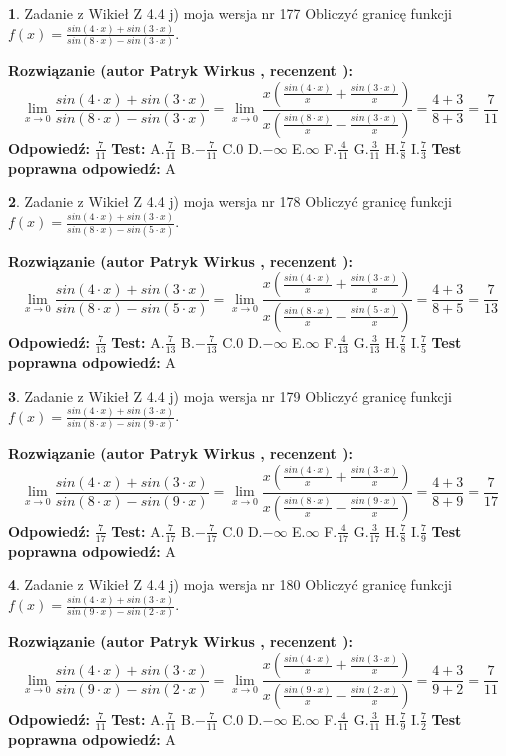 \documentclass[12pt, a4paper]{article}
\theoremstyle{definition} %
\newtheorem{zad}{}
\newcommand{\zadStart}[1]{\begin{zad}#1\newline}
\newcommand{\zadStop}{\end{zad}}
\newcommand{\rozwStart}[2]{\noindent \textbf{Rozwiązanie (autor #1 , recenzent #2): }\newline}
\newcommand{\rozwStop}{\newline}
\newcommand{\odpStart}{\noindent \textbf{Odpowiedź:}\newline}
\newcommand{\odpStop}{\newline}
\newcommand{\testStart}{\noindent \textbf{Test:}\newline}
\newcommand{\testStop}{\newline}
\newcommand{\kluczStart}{\noindent \textbf{Test poprawna odpowiedź:}\newline}
\newcommand{\kluczStop}{\newline}
\begin{document}
\zadStart{Zadanie z Wikieł Z 4.4 j) moja wersja nr 177}
Obliczyć granicę funkcji $f(x)=\frac{sin(4\cdot x) +sin(3\cdot x)}{sin(8\cdot x) -sin(3\cdot x)}$.
\zadStop
\rozwStart{Patryk Wirkus}{}
$$\lim\limits_{x\to 0}\frac{sin(4\cdot x) +sin(3\cdot x)}{sin(8\cdot x) -sin(3\cdot x)}=\lim\limits_{x\to 0}\frac{x(\frac{sin(4\cdot x)}{x}+\frac{sin(3\cdot x)}{x})}{x(\frac{sin(8\cdot x)}{x}-\frac{sin(3\cdot x)}{x})}=\frac{4+3}{8+3} = \frac{7}{11}$$
\rozwStop
\odpStart
$\frac{7}{11}$
\odpStop
\testStart
A.$\frac{7}{11}$
B.$-\frac{7}{11}$
C.$0$
D.$-\infty$
E.$\infty$
F.$\frac{4}{11}$
G.$\frac{3}{11}$
H.$\frac{7}{8}$
I.$\frac{7}{3}$
\testStop
\kluczStart
A
\kluczStop



\zadStart{Zadanie z Wikieł Z 4.4 j) moja wersja nr 178}
Obliczyć granicę funkcji $f(x)=\frac{sin(4\cdot x) +sin(3\cdot x)}{sin(8\cdot x) -sin(5\cdot x)}$.
\zadStop
\rozwStart{Patryk Wirkus}{}
$$\lim\limits_{x\to 0}\frac{sin(4\cdot x) +sin(3\cdot x)}{sin(8\cdot x) -sin(5\cdot x)}=\lim\limits_{x\to 0}\frac{x(\frac{sin(4\cdot x)}{x}+\frac{sin(3\cdot x)}{x})}{x(\frac{sin(8\cdot x)}{x}-\frac{sin(5\cdot x)}{x})}=\frac{4+3}{8+5} = \frac{7}{13}$$
\rozwStop
\odpStart
$\frac{7}{13}$
\odpStop
\testStart
A.$\frac{7}{13}$
B.$-\frac{7}{13}$
C.$0$
D.$-\infty$
E.$\infty$
F.$\frac{4}{13}$
G.$\frac{3}{13}$
H.$\frac{7}{8}$
I.$\frac{7}{5}$
\testStop
\kluczStart
A
\kluczStop



\zadStart{Zadanie z Wikieł Z 4.4 j) moja wersja nr 179}
Obliczyć granicę funkcji $f(x)=\frac{sin(4\cdot x) +sin(3\cdot x)}{sin(8\cdot x) -sin(9\cdot x)}$.
\zadStop
\rozwStart{Patryk Wirkus}{}
$$\lim\limits_{x\to 0}\frac{sin(4\cdot x) +sin(3\cdot x)}{sin(8\cdot x) -sin(9\cdot x)}=\lim\limits_{x\to 0}\frac{x(\frac{sin(4\cdot x)}{x}+\frac{sin(3\cdot x)}{x})}{x(\frac{sin(8\cdot x)}{x}-\frac{sin(9\cdot x)}{x})}=\frac{4+3}{8+9} = \frac{7}{17}$$
\rozwStop
\odpStart
$\frac{7}{17}$
\odpStop
\testStart
A.$\frac{7}{17}$
B.$-\frac{7}{17}$
C.$0$
D.$-\infty$
E.$\infty$
F.$\frac{4}{17}$
G.$\frac{3}{17}$
H.$\frac{7}{8}$
I.$\frac{7}{9}$
\testStop
\kluczStart
A
\kluczStop



\zadStart{Zadanie z Wikieł Z 4.4 j) moja wersja nr 180}
Obliczyć granicę funkcji $f(x)=\frac{sin(4\cdot x) +sin(3\cdot x)}{sin(9\cdot x) -sin(2\cdot x)}$.
\zadStop
\rozwStart{Patryk Wirkus}{}
$$\lim\limits_{x\to 0}\frac{sin(4\cdot x) +sin(3\cdot x)}{sin(9\cdot x) -sin(2\cdot x)}=\lim\limits_{x\to 0}\frac{x(\frac{sin(4\cdot x)}{x}+\frac{sin(3\cdot x)}{x})}{x(\frac{sin(9\cdot x)}{x}-\frac{sin(2\cdot x)}{x})}=\frac{4+3}{9+2} = \frac{7}{11}$$
\rozwStop
\odpStart
$\frac{7}{11}$
\odpStop
\testStart
A.$\frac{7}{11}$
B.$-\frac{7}{11}$
C.$0$
D.$-\infty$
E.$\infty$
F.$\frac{4}{11}$
G.$\frac{3}{11}$
H.$\frac{7}{9}$
I.$\frac{7}{2}$
\testStop
\kluczStart
A
\kluczStop
\end{document}
